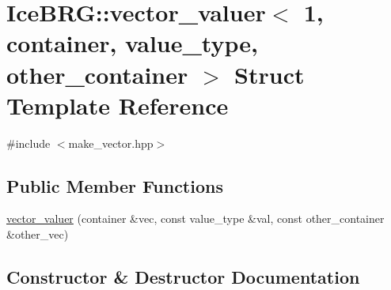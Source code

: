 \hypertarget{structIceBRG_1_1vector__valuer_3_011_00_01container_00_01value__type_00_01other__container_01_4}{}\section{Ice\+B\+R\+G\+:\+:vector\+\_\+valuer$<$ 1, container, value\+\_\+type, other\+\_\+container $>$ Struct Template Reference}
\label{structIceBRG_1_1vector__valuer_3_011_00_01container_00_01value__type_00_01other__container_01_4}


{\ttfamily \#include $<$make\+\_\+vector.\+hpp$>$}

\subsection*{Public Member Functions}
\begin{DoxyCompactItemize}
\item 
\hyperlink{structIceBRG_1_1vector__valuer_3_011_00_01container_00_01value__type_00_01other__container_01_4_a2a71478b130b616baa90e057b25ba0ed}{vector\+\_\+valuer} (container \&vec, const value\+\_\+type \&val, const other\+\_\+container \&other\+\_\+vec)
\end{DoxyCompactItemize}


\subsection{Constructor \& Destructor Documentation}
\hypertarget{structIceBRG_1_1vector__valuer_3_011_00_01container_00_01value__type_00_01other__container_01_4_a2a71478b130b616baa90e057b25ba0ed}{}
